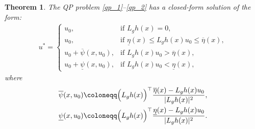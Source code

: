 \documentclass[letterpaper, 10 pt, conference]{ieeeconf}
\newtheorem{theorem}{Theorem}
\newcommand{\TODO}[1]{{\color{black}#1}}
\begin{document}
\begin{theorem}\label{thrm_kkt}
    The QP problem \eqref{qp_1}--\eqref{qp_2} has a closed-form solution of the form:
    \TODO{
    \begin{align}\label{control_law_rel1}
        u^* = \begin{cases}
            u_0, & \text{if } L_g h(x) = 0, \\
            u_0, & \text{if } \underline{\eta}(x) \leq L_g h(x) u_0 \leq \overline{\eta}(x), \\
            u_0 + \overline{\psi}(x,u_0), & \text{if } L_g h(x) u_0 > \overline{\eta}(x), \\
            u_0 + \underline{\psi}(x,u_0), & \text{if } L_g h(x) u_0 < \underline{\eta}(x),
            \end{cases}
    \end{align}
    where 
    \begin{align}
        \overline{\psi}(x,u_0) \coloneqq \Bigl( L_g h(x)\Bigr)^\top\dfrac{\overline{\eta}(x) - L_g h(x) u_0 }{| L_g h(x) |^2},\\
        \underline{\psi}(x,u_0) \coloneqq \Bigl( L_g h(x)\Bigr)^\top\dfrac{\underline{\eta}(x) - L_g h(x) u_0 }{| L_g h(x) |^2}.
    \end{align}
    }
\end{theorem}
\end{document}

